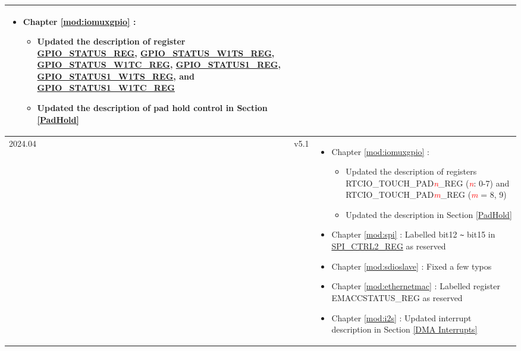 \begin{longtable}[l]{ | m{2cm} | m{1.5cm} | m{12cm} | }
\begin{itemize}
\begin{itemize}
        \end{itemize}
     \item Chapter \ref{mod:iomuxgpio} \textit{\nameref{mod:iomuxgpio}}:
        \begin{itemize}
            \item Updated the description of register \hyperref[regdesc:GPIOSTATUSREG]{GPIO\_STATUS\_REG}, \hyperref[regdesc:GPIOSTATUSW1TSREG]{GPIO\_STATUS\_W1TS\_REG}, \hyperref[regdesc:GPIOSTATUSW1TCREG]{GPIO\_STATUS\_W1TC\_REG}, \hyperref[regdesc:GPIOSTATUS1REG]{GPIO\_STATUS1\_REG}, \hyperref[regdesc:GPIOSTATUS1W1TSREG]{GPIO\_STATUS1\_W1TS\_REG}, and \hyperref[regdesc:GPIOSTATUS1W1TCREG]{GPIO\_STATUS1\_W1TC\_REG}  %
            \item Updated the description of pad hold control in Section \ref{PadHold}
        \end{itemize}

 \end{itemize}
 \vspace{-1em}
\\\hline

    2024.04 & v5.1 &
    \vspace{0.5em}
    \begin{itemize}
        \item Chapter \ref{mod:iomuxgpio} \textit{\nameref{mod:iomuxgpio}}:
        \begin{itemize}
            \item Updated the description of registers RTCIO\_TOUCH\_PAD\textcolor{red}{\it{n}}\_REG (\textcolor{red}{\it{n}}: 0-7) and RTCIO\_TOUCH\_PAD\textcolor{red}{\it{m}}\_REG (\textcolor{red}{\it{m}} = 8, 9)
            \item Updated the description in Section \ref{PadHold} %
        \end{itemize}

        \item Chapter \ref{mod:spi} \textit{\nameref{mod:spi}}: Labelled bit12 \verb+~+ bit15 in \hyperlink{regdesc:SPICTRL2REG}{SPI\_CTRL2\_REG} as reserved %

        \item  Chapter \ref{mod:sdioslave} \textit{\nameref{mod:sdioslave}}: Fixed a few typos

        \item Chapter \ref{mod:ethernetmac} \textit{\nameref{mod:ethernetmac}}: Labelled register EMACCSTATUS\_REG as reserved %

        \item Chapter \ref{mod:i2s} \textit{\nameref{mod:i2s}}: Updated interrupt description in Section \ref{DMA Interrupts} %


\end{itemize}
\end{longtable}

